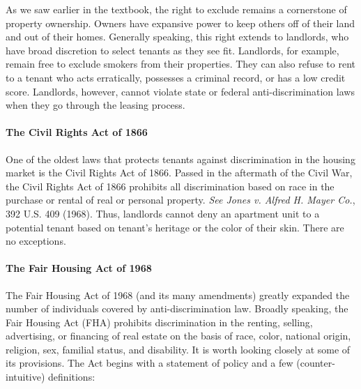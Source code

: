 
As we saw earlier in the textbook, the right to exclude remains a cornerstone of
property ownership.  Owners have expansive power to keep others off of their
land and out of their homes.  Generally speaking, this right extends to
landlords, who have broad discretion to select tenants as they see fit. 
Landlords, for example, remain free to exclude smokers from their properties. 
They can also refuse to rent to a tenant who acts erratically, possesses a
criminal record, or has a low credit score. Landlords, however, cannot violate
state or federal anti-discrimination laws when they go through the leasing
process.  

\paragraph{The Civil Rights Act of 1866}

One of the oldest laws that protects tenants against discrimination in the
housing market is the Civil Rights Act of 1866.  Passed in the aftermath of the
Civil War, the Civil Rights Act of 1866 prohibits all discrimination based on
race in the purchase or rental of real or personal property.  \textit{See Jones
v. Alfred H. Mayer Co.}, 392 U.S. 409 (1968).  Thus, landlords cannot deny an
apartment unit to a potential tenant based on tenant's heritage or the color of
their skin.  There are no exceptions.

\paragraph{The Fair Housing Act of 1968}

The Fair Housing Act of 1968 (and its many amendments) greatly expanded the
number of individuals covered by anti-discrimination law.  Broadly speaking,
the Fair Housing Act (FHA) prohibits discrimination in the renting, selling,
advertising, or financing of real estate on the basis of race, color, national
origin, religion, sex, familial status, and disability.  It is worth looking
closely at some of its provisions. The Act begins with a statement of policy
and a few (counter-intuitive) definitions:

